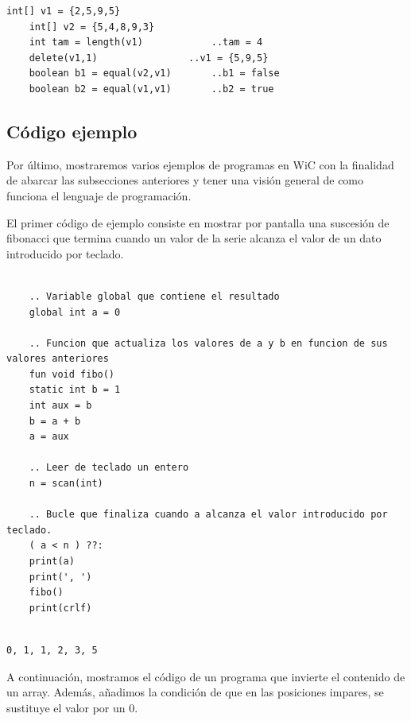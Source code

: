 \documentclass[11pt, english]{article}
\begin{document}
	\begin{lstlisting}[caption=Ejemplo de uso de funciones primitivas para arrays numéricos]
	int[] v1 = {2,5,9,5}
	int[] v2 = {5,4,8,9,3}
	int tam = length(v1)			..tam = 4
	delete(v1,1)				..v1 = {5,9,5}
	boolean b1 = equal(v2,v1)		..b1 = false
	boolean b2 = equal(v1,v1)		..b2 = true
	\end{lstlisting}
	
	
	\subsection{Código ejemplo}\label{example-code}
	Por último, mostraremos varios ejemplos de programas en WiC con la finalidad de abarcar las subsecciones anteriores y tener una visión general de como funciona el lenguaje de programación.
	
	\vspace{5mm}
	El primer código de ejemplo consiste en mostrar por pantalla una suscesión de fibonacci que termina cuando un valor de la serie alcanza el valor de un dato introducido por teclado.
	
	\begin{lstlisting}[caption=Ejemplo de la función Fibonacci con parametros introducidos.]
	
	.. Variable global que contiene el resultado
	global int a = 0
	
	.. Funcion que actualiza los valores de a y b en funcion de sus valores anteriores
	fun void fibo()
	static int b = 1
	int aux = b
	b = a + b
	a = aux
	
	.. Leer de teclado un entero
	n = scan(int)
	
	.. Bucle que finaliza cuando a alcanza el valor introducido por teclado.
	( a < n ) ??:
	print(a)
	print(', ')
	fibo()
	print(crlf)
	
	\end{lstlisting}
	
	\begin{lstlisting}[caption=Salida en consola para '' n -> \  6 ''.]
	0, 1, 1, 2, 3, 5
	\end{lstlisting}
	\vspace{5mm}
	A continuación, mostramos el código de un programa que invierte el contenido de un array. Además, añadimos la condición de que en las posiciones impares, se sustituye el valor por un 0.
	
\end{document}
